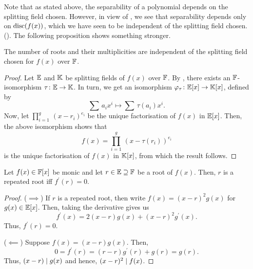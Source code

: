 \begin{rem}
    Note that as stated above, the separability of a polynomial depends on the splitting field chosen. However, in view of , we see that separability depends only on $\operatorname{disc}(f(x))$, which we have seen to be independent of the splitting field chosen. (). The following proposition shows something stronger.
\end{rem}
\begin{prop} \label{prop:roots-mults-independent-of-SF}
    The number of roots and their multiplicities are independent of the splitting field chosen for $f(x)$ over $\mathbb{F}$.
\end{prop}
\begin{proof}
    Let $\mathbb{E}$ and $\mathbb{K}$ be splitting fields of $f(x)$ over $\mathbb{F}$. By , there exists an $\mathbb{F}$-isomorphism $\tau \colon \mathbb{E} \to \mathbb{K}$. In turn, we get an isomorphism $\varphi_{\tau} \colon \mathbb{E}[x] \to \mathbb{K}[x]$, defined by
    \[
        \sum \, a_i x^i \mapsto \sum \, \tau(a_i) x^i.
    \]
    Now, let $\prod_{i=1}^g \, (x-r_i)^{e_i}$ be the unique factorisation of $f(x)$ in $\mathbb{E}[x]$. Then, the above isomorphism shows that
    \[
        f(x) = \prod_{i=1}^g \, (x-\tau(r_i))^{e_i}
    \]
    is the unique factorisation of $f(x)$ in $\mathbb{K}[x]$, from which the result follows.
\end{proof}
\begin{prop} \label{prop:repeated-root-iff-derivative-zero}
    Let $f(x) \in \mathbb{F}[x]$ be monic and let $r \in \mathbb{E} \supseteq \mathbb{F}$ be a root of $f(x)$. Then, $r$ is a repeated root iff $f^{\prime}(r) = 0$.
\end{prop}
\begin{proof}
    ($\implies$) If $r$ is a repeated root, then write $f(x) = (x-r)^2 g(x)$ for $g(x) \in \mathbb{E}[x]$. Then, taking the derivative gives us
    \[
        f^{\prime}(x) = 2(x-r)g(x) + (x-r)^2 g^{\prime}(x).
    \]
    Thus, $f^{\prime}(r) = 0$.
    
    ($\impliedby$) Suppose $f(x) = (x-r)g(x)$. Then,
    \[
        0 = f^{\prime}(r) = (r-r)g^{\prime}(r) + g(r) = g(r).
    \]
    Thus, $(x-r) \mid g(x)$ and hence, $(x-r)^2 \mid f(x)$.
\end{proof}


